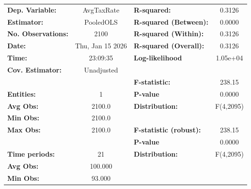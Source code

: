 \begin{center}
\begin{tabular}{lclc}
\toprule
\textbf{Dep. Variable:}                          &     AvgTaxRate     & \textbf{  R-squared:         }   &      0.3126      \\
\textbf{Estimator:}                              &     PooledOLS      & \textbf{  R-squared (Between):}  &      0.0000      \\
\textbf{No. Observations:}                       &        2100        & \textbf{  R-squared (Within):}   &      0.3126      \\
\textbf{Date:}                                   &  Thu, Jan 15 2026  & \textbf{  R-squared (Overall):}  &      0.3126      \\
\textbf{Time:}                                   &      23:09:35      & \textbf{  Log-likelihood     }   &     1.05e+04     \\
\textbf{Cov. Estimator:}                         &     Unadjusted     & \textbf{                     }   &                  \\
\textbf{}                                        &                    & \textbf{  F-statistic:       }   &      238.15      \\
\textbf{Entities:}                               &         1          & \textbf{  P-value            }   &      0.0000      \\
\textbf{Avg Obs:}                                &       2100.0       & \textbf{  Distribution:      }   &    F(4,2095)     \\
\textbf{Min Obs:}                                &       2100.0       & \textbf{                     }   &                  \\
\textbf{Max Obs:}                                &       2100.0       & \textbf{  F-statistic (robust):} &      238.15      \\
\textbf{}                                        &                    & \textbf{  P-value            }   &      0.0000      \\
\textbf{Time periods:}                           &         21         & \textbf{  Distribution:      }   &    F(4,2095)     \\
\textbf{Avg Obs:}                                &      100.000       & \textbf{                     }   &                  \\
\textbf{Min Obs:}                                &       93.000       & \textbf{                     }   &                  \\

\end{tabular}
\end{center}
